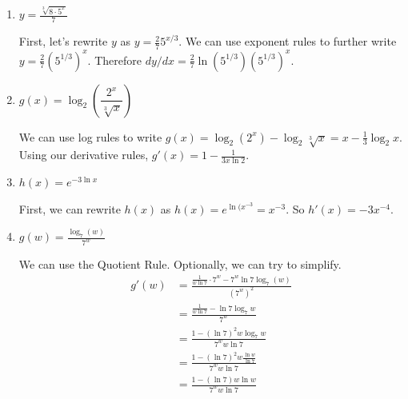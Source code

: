 \documentclass{article}
\begin{document}
\begin{enumerate}[resume]
\begin{enumerate}
    \begin{solution}
      We can rewrite $j(x)$ as $j(x)=e^{-2}e^{3x}$. So
      $j'(x)=3e^{-2}e^{3x}=\boxed{3e^{3x-2}}$.
    \end{solution}

  \item
    \begin{problem}[\vfill]
      $\displaystyle y = \frac{\sqrt[3]{8 \cdot 5^x}}{7}$
    \end{problem}

    \begin{solution}
      First, let's rewrite $y$ as $y=\tfrac{2}{7} 5^{x/3}$. We
      can use exponent rules to further write $y=\tfrac{2}{7} (5^{1/3})^x$.
      Therefore $dy/dx = \boxed{\tfrac{2}{7} \ln(5^{1/3}) (5^{1/3})^x}$.
    \end{solution}

  \item
    \begin{problem}[\vfill]
      $g(x) = \log_2 \left( \dfrac{2^x}{\sqrt[3]{x}} \right)$
    \end{problem}

    \begin{solution}
      We can use log rules to write 
      $g(x) = \log_2 (2^x) - \log_2 \sqrt[3]{x} 
      = x - \tfrac{1}{3} \log_2 x$. Using our derivative rules,
      $g'(x) = \boxed{1-\frac{1}{3x\ln2}}$.
    \end{solution}

  \item
    \begin{problem}[\vfill]
      $h(x) = e^{-3 \ln x}$
    \end{problem}

    \begin{solution}
      First, we can rewrite $h(x)$ as $h(x) = e^{\ln(x^{-3}}=x^{-3}$.
      So $h'(x) = \boxed{-3x^{-4}}$.
    \end{solution}

  \item

    \begin{problem}[\vfill\newpage]
      $\displaystyle g(w) = \frac{\log_7(w)}{7^w}$
    \end{problem}

    \begin{solution}
      We can use the Quotient Rule. Optionally, we can try to simplify.
      \begin{align*}
          g'(w) &= \frac{\frac{1}{w\ln7}\cdot 7^w - 7^w\ln7 \log_7(w)}{(7^w)^2} \\
          &= \frac{\frac{1}{w\ln7}-\ln7 \log_7{w}}{7^w} \\
          &= \frac{1-(\ln 7)^2w\log_7 w}{7^w w \ln 7} \\
          &= \frac{1-(\ln 7)^2w\frac{\ln w}{\ln7}}{7^w w \ln 7} \\
          &= \boxed{\frac{1-(\ln7) w\ln w}{7^w w \ln 7}}
      \end{align*}
    \end{solution}


\end{enumerate}
\end{enumerate}
\end{document}
